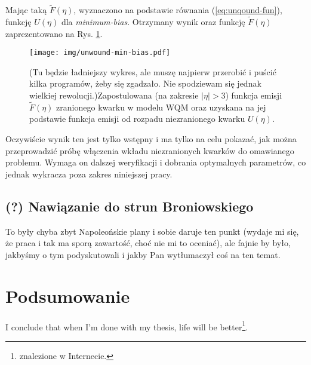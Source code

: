 \documentclass[a4paper,12pt]{article}
\begin{document}
Mając taką $\widetilde{F}(\eta)$, wyznaczono na podstawie równania (\ref{eq:unqound-fun}), funkcję $U(\eta)$ dla \textit{minimum-bias}. Otrzymany wynik oraz funkcję $\widetilde{F}(\eta)$ zaprezentowano na Rys. \ref{fig:unwound-fun}.

\begin{figure}[H]
	\begin{center}
	\texttt{[image: img/unwound-min-bias.pdf]}
	\vspace{-0.1in}
		\caption{ {\color{blue} (Tu będzie ładniejszy wykres, ale muszę najpierw przerobić i puścić kilka programów, żeby się zgadzało. Nie spodziewam się jednak wielkiej rewolucji.)}Zapostulowana (na zakresie $|\eta| > 3$) funkcja emisji $\widetilde{F}(\eta)$ zranionego kwarku w modelu WQM  oraz uzyskana na jej podstawie funkcja emisji od rozpadu niezranionego kwarku $U(\eta)$.} \label{fig:unwound-fun}
	\end{center}
\end{figure}

Oczywiście wynik ten jest tylko wstępny i ma tylko na celu pokazać, jak można przeprowadzić próbę włączenia wkładu niezranionych kwarków do omawianego problemu. Wymaga on dalszej weryfikacji i dobrania optymalnych parametrów, co jednak wykracza poza zakres niniejszej pracy.

\paragraph{}
\subsection{(?) Nawiązanie do strun Broniowskiego}
{\color{blue} To były chyba zbyt Napoleońskie plany i sobie daruje ten punkt (wydaje mi się, że praca i tak ma sporą zawartość, choć nie mi to oceniać), ale fajnie by było, jakbyśmy o tym podyskutowali i jakby Pan wytłumaczył coś na ten temat.}

\newpage
\section{Podsumowanie}
{\color{blue}I conclude that when I'm done with my thesis, life will be better\footnote{znalezione w Internecie.}.}
\end{document}
